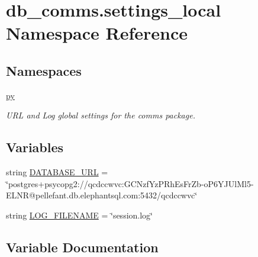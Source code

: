 \hypertarget{namespacedb__comms_1_1settings__local}{}\section{db\+\_\+comms.\+settings\+\_\+local Namespace Reference}
\label{namespacedb__comms_1_1settings__local}
\subsection*{Namespaces}
\begin{DoxyCompactItemize}
\item 
 \hyperlink{namespacedb__comms_1_1settings__local_1_1py}{py}
\begin{DoxyCompactList}\small\item\em U\+R\+L and Log global settings for the comms package. \end{DoxyCompactList}\end{DoxyCompactItemize}
\subsection*{Variables}
\begin{DoxyCompactItemize}
\item 
string \hyperlink{namespacedb__comms_1_1settings__local_a8eb71159b43e28de397305844fa2a891}{D\+A\+T\+A\+B\+A\+S\+E\+\_\+\+U\+R\+L} = \char`\"{}postgres+psycopg2\+://qcdccwvc\+:\+G\+C\+Nzf\+Yz\+P\+Rh\+Es\+Fr\+Zb-\/o\+P6\+Y\+J\+Ul\+Ml5-\/E\+L\+N\+R@pellefant.\+db.\+elephantsql.\+com\+:5432/qcdccwvc\char`\"{}
\item 
string \hyperlink{namespacedb__comms_1_1settings__local_a909832b9d5522628a8edde898db1b8b4}{L\+O\+G\+\_\+\+F\+I\+L\+E\+N\+A\+M\+E} = \char`\"{}session.\+log\char`\"{}
\end{DoxyCompactItemize}


\subsection{Variable Documentation}
\hypertarget{namespacedb__comms_1_1settings__local_a8eb71159b43e28de397305844fa2a891}{}
